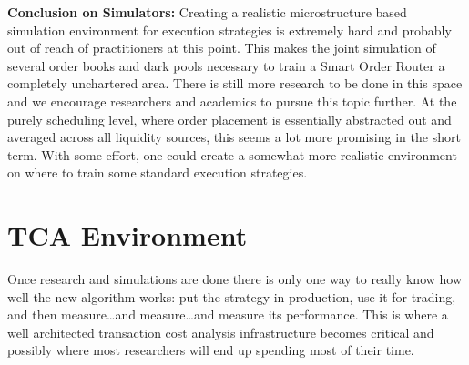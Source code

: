 \noindent\textbf{Conclusion on Simulators:} Creating a realistic microstructure based simulation environment for execution strategies is extremely hard and probably out of reach of practitioners at this point. This makes the joint simulation of several order books and dark pools necessary to train a Smart Order Router a completely unchartered area. There is still more research to be done in this space and we encourage researchers and academics to pursue this topic further. At the purely scheduling level, where order placement is essentially abstracted out and averaged across all liquidity sources, this seems a lot more promising in the short term. With some effort, one could create a somewhat more realistic environment on where to train some standard execution strategies.



\section{TCA Environment}

Once research and simulations are done there is only one way to really know how well the new algorithm works: put the strategy in production, use it for trading, and then measure\dots and measure\dots and measure its performance. This is where a well architected transaction cost analysis infrastructure becomes critical and possibly where most researchers will end up spending most of their time. 



